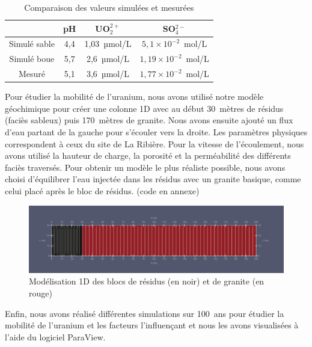 \documentclass{article}
\begin{document}
\begin{table}[H]
    \centering    
    \caption{Comparaison des valeurs simulées et mesurées}
    \begin{tabular}{ |c |c |c |c |}
        \hline
         \textbf{} & \textbf{pH} & \textbf{UO$_2^{2+}$} & \textbf{SO$_4^{2-}$}\\ 
         \hline
         Simulé sable & 4,4 & 1,03~µmol/L & $5,1 \times 10^{-2}$~mol/L \\ 
         \hline
         Simulé boue & 5,7 & 2,6~µmol/L & $1,19 \times 10^{-2}$~mol/L  \\
         \hline
        Mesuré & 5,1 & 3,6~µmol/L & $1,77 \times 10^{-2}$~mol/L  \\
         \hline
    \end{tabular}

    \label{tab:comparaison_valeurs_simul_mesure}
\end{table}

	
Pour étudier la mobilité de l’uranium, nous avons utilisé notre modèle géochimique pour créer une colonne 1D avec au début 30~mètres de résidus (faciès sableux) puis 170~mètres de granite. Nous avons ensuite ajouté un flux d’eau partant de la gauche pour s’écouler vers la droite. Les paramètres physiques correspondent à ceux du site de La Ribière. Pour la vitesse de l’écoulement, nous avons utilisé la hauteur de charge, la porosité et la perméabilité des différents faciès traversés. Pour obtenir un modèle le plus réaliste possible, nous avons choisi d’équilibrer l’eau injectée dans les résidus avec un granite basique, comme celui placé après le bloc de résidus. (code en annexe)


\begin{figure}[H]
    \centering
    \includegraphics[width=0.9\linewidth]{III_B_2_1.png}
    \caption{Modélisation 1D des blocs de résidus (en noir) et de granite (en rouge)}
    \label{fig:modele_bloc}
\end{figure}

Enfin, nous avons réalisé différentes simulations sur 100~ans pour étudier la mobilité de l’uranium et les facteurs l’influençant et nous les avons visualisées à l’aide du logiciel ParaView.
\end{document}
